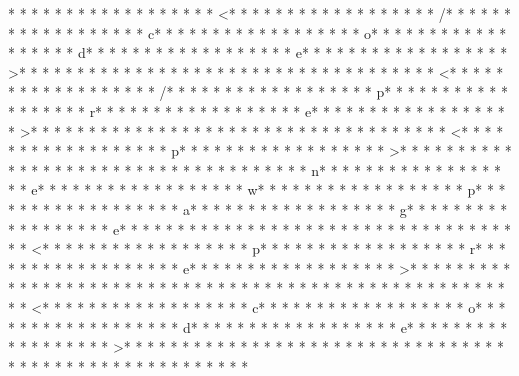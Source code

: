 * * *  * * *  * * *  *  * * *  *  * * *  * <* * *  * * *  * * *  *  * * *  *  * * *  * /* * *  * * *  * * *  *  * * *  *  * * *  * c* * *  * * *  * * *  *  * * *  *  * * *  * o* * *  * * *  * * *  *  * * *  *  * * *  * d* * *  * * *  * * *  *  * * *  *  * * *  * e* * *  * * *  * * *  *  * * *  *  * * *  * >* * *  * * *  * * *  *  * * *  *  * * *  * 
* * *  * * *  * * *  *  * * *  *  * * *  * <* * *  * * *  * * *  *  * * *  *  * * *  * /* * *  * * *  * * *  *  * * *  *  * * *  * p* * *  * * *  * * *  *  * * *  *  * * *  * r* * *  * * *  * * *  *  * * *  *  * * *  * e* * *  * * *  * * *  *  * * *  *  * * *  * >* * *  * * *  * * *  *  * * *  *  * * *  * 
* * *  * * *  * * *  *  * * *  *  * * *  * <* * *  * * *  * * *  *  * * *  *  * * *  * p* * *  * * *  * * *  *  * * *  *  * * *  * >* * *  * * *  * * *  *  * * *  *  * * *  * 
* * *  * * *  * * *  *  * * *  *  * * *  * n* * *  * * *  * * *  *  * * *  *  * * *  * e* * *  * * *  * * *  *  * * *  *  * * *  * w* * *  * * *  * * *  *  * * *  *  * * *  * p* * *  * * *  * * *  *  * * *  *  * * *  * a* * *  * * *  * * *  *  * * *  *  * * *  * g* * *  * * *  * * *  *  * * *  *  * * *  * e* * *  * * *  * * *  *  * * *  *  * * *  * 
* * *  * * *  * * *  *  * * *  *  * * *  * <* * *  * * *  * * *  *  * * *  *  * * *  * p* * *  * * *  * * *  *  * * *  *  * * *  * r* * *  * * *  * * *  *  * * *  *  * * *  * e* * *  * * *  * * *  *  * * *  *  * * *  * >* * *  * * *  * * *  *  * * *  *  * * *  * 
* * *  * * *  * * *  *  * * *  *  * * *  * 	* * *  * * *  * * *  *  * * *  *  * * *  * <* * *  * * *  * * *  *  * * *  *  * * *  * c* * *  * * *  * * *  *  * * *  *  * * *  * o* * *  * * *  * * *  *  * * *  *  * * *  * d* * *  * * *  * * *  *  * * *  *  * * *  * e* * *  * * *  * * *  *  * * *  *  * * *  * >* * *  * * *  * * *  *  * * *  *  * * *  * 
* * *  * * *  * * *  *  * * *  *  * * *  * 	* * *  * * *  * * *  *  * * *  *  * * *  * 
